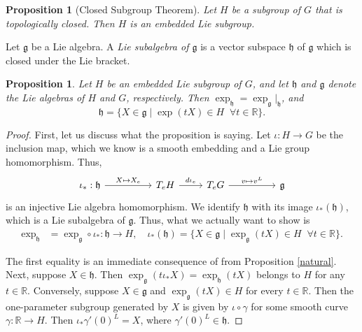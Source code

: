 \documentclass{amsart}
\newcommand{\R}{\mathbb R}
\newcommand{\h}{\mathfrak h}
\newcommand{\g}{\mathfrak g}
\theoremstyle{plain}
\newtheorem{proposition}[theorem]{Proposition}
\theoremstyle{definition}
\theoremstyle{remark}
\begin{document}
	\begin{proposition}[Closed Subgroup Theorem]
		Let $H$ be a subgroup of $G$ that is topologically closed. Then $H$ is an embedded Lie subgroup.
	\end{proposition}

	Let $\g$ be a Lie algebra. A \emph{Lie subalgebra of $\g$}  is a vector subspace $\h$ of $\g$ which is closed under the Lie bracket.

	\begin{proposition}
		Let $H$ be an embedded Lie subgroup of $G$, and let $\h$ and $\g$ denote the Lie algebras of $H$ and $G$, respectively. Then $\exp_\h = \exp_\g|_\h$, and 
		$$\h= \Big\{X \in \g \; \Big| \;  \exp(tX) \in H \;\; \forall t \in \R\Big\}.$$
	\end{proposition}
	\begin{proof}
		First, let us discuss what the proposition is saying. Let $\iota:H \rightarrow G$ be the inclusion map, which we know is a smooth embedding and a Lie group homomorphism. Thus, 
		$$\begin{tikzcd}
			\iota_*: \h \arrow{rr}{X \mapsto X_e} && T_e H \arrow{r}{d\iota_e} & T_e G \arrow{rr}{v\mapsto v^L}  &&\g
		\end{tikzcd}$$
		is an injective Lie algebra homomorphism. We identify $\h$ with its image $\iota_*(\h)$, which is a Lie subalgebra of $\g$. Thus, what we actually want to show is 
		\begin{align*}
			\exp_\h &= \exp_\g \circ  \iota_*: \h \rightarrow H, \quad
			\iota_*(\h)= \Big\{X \in \g \; \Big| \;  \exp_\g(tX) \in H \;\; \forall t \in \R\Big\}.
		\end{align*}
	
		The first equality is an immediate consequence of from Proposition \ref{natural}. Next, suppose $X \in \h$. Then $\exp_\g(t \iota_* X) = \exp_\h(tX)$ belongs to $H$ for any $t \in \R$. Conversely, suppose $X \in \g$ and $\exp_\g(tX) \in H$ for every $t \in \R$. Then the one-parameter subgroup generated by $X$ is given by $\iota \circ \gamma$ for some smooth curve $\gamma:\R \rightarrow H$. Then 
		$\iota_* \gamma'(0)^L = X$, where  $\gamma'(0)^L \in \h$.
	\end{proof}
\end{document}
